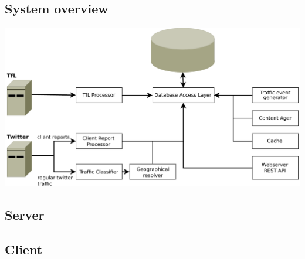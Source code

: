 
\subsection{System overview}
	\begin{center}
	\includegraphics[scale=0.37]{images/high_level_system_arch.pdf}
	\end{center}
\subsection{Server}
  

\subsection{Client}
  

